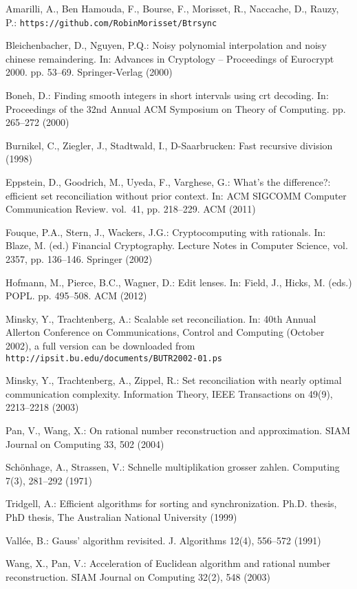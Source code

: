 \documentclass[11pt]{llncs}
\begin{document}
\begin{thebibliography}{10}
\providecommand{\url}[1]{\texttt{#1}}
\providecommand{\urlprefix}{URL }

Amarilli, A., {Ben Hamouda}, F., Bourse, F., Morisset, R., Naccache, D., Rauzy,
  P.: \url{https://github.com/RobinMorisset/Btrsync}

Bleichenbacher, D., Nguyen, P.Q.: Noisy polynomial interpolation and noisy
  chinese remaindering. In: Advances in Cryptology -- Proceedings of Eurocrypt
  2000. pp. 53--69. Springer-Verlag (2000)

Boneh, D.: Finding smooth integers in short intervals using crt decoding. In:
  Proceedings of the 32nd Annual ACM Symposium on Theory of Computing. pp.
  265--272 (2000)

Burnikel, C., Ziegler, J., Stadtwald, I., D-Saarbrucken: Fast recursive
  division (1998)

Eppstein, D., Goodrich, M., Uyeda, F., Varghese, G.: What's the difference?:
  efficient set reconciliation without prior context. In: ACM SIGCOMM Computer
  Communication Review. vol.~41, pp. 218--229. ACM (2011)

Fouque, P.A., Stern, J., Wackers, J.G.: Cryptocomputing with rationals. In:
  Blaze, M. (ed.) Financial Cryptography. Lecture Notes in Computer Science,
  vol. 2357, pp. 136--146. Springer (2002)

Hofmann, M., Pierce, B.C., Wagner, D.: Edit lenses. In: Field, J., Hicks, M.
  (eds.) POPL. pp. 495--508. ACM (2012)

Minsky, Y., Trachtenberg, A.: Scalable set reconciliation. In: 40th Annual
  Allerton Conference on Communications, Control and Computing (October 2002),
  a full version can be downloaded from
  \url{http://ipsit.bu.edu/documents/BUTR2002-01.ps}

Minsky, Y., Trachtenberg, A., Zippel, R.: Set reconciliation with nearly
  optimal communication complexity. Information Theory, IEEE Transactions on
  49(9),  2213--2218 (2003)

Pan, V., Wang, X.: On rational number reconstruction and approximation. SIAM
  Journal on Computing  33,  502 (2004)

Sch{\"o}nhage, A., Strassen, V.: Schnelle multiplikation grosser zahlen.
  Computing  7(3),  281--292 (1971)

Tridgell, A.: Efficient algorithms for sorting and synchronization. Ph.D.
  thesis, PhD thesis, The Australian National University (1999)

Vall{\'e}e, B.: Gauss' algorithm revisited. J. Algorithms  12(4),  556--572
  (1991)

Wang, X., Pan, V.: Acceleration of {E}uclidean algorithm and rational number
  reconstruction. SIAM Journal on Computing  32(2),  548 (2003)

\end{thebibliography}
\end{document}
